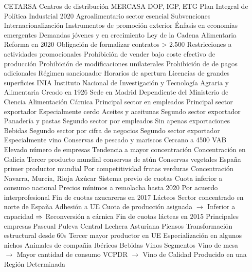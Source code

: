 \documentclass{nuevotema}
\begin{document}
\begin{esquemal}
				\4 CETARSA
			\3 Centros de distribución MERCASA
			\3 DOP, IGP, ETG
			\3 Plan Integral de Política Industrial 2020
				\4 Agroalimentario sector esencial
				\4 Subvenciones
			\3 Internacionalización
				\4 Instrumentos de promoción exterior
				\4 Énfasis en economías emergentes
				\4[] Demandas jóvenes y en crecimiento
			\3 Ley de la Cadena Alimentaria
				\4 Reforma en 2020
				\4[] Obligación de formalizar contratos > 2.500
				\4[] Restricciones a actividades promocionales
				\4[] Prohibición de vender bajo coste efectivo de producción
				\4[] Prohibición de modificaciones unilaterales
				\4[] Prohibición de de pagos adicionales
				\4[] Régimen sancionador
			\3 Horarios de apertura
			\3 Licencias de grandes superficies
			\3 INIA
				\4 Instituto Nacional de Investigación y Tecnología Agraria y Alimentaria
				\4 Creado en 1926
				\4 Sede en Madrid
				\4 Dependiente del Ministerio de Ciencia
		\2 Alimentación
			\3 Cárnica
				\4 Principal sector en empleados
				\4 Principal sector exportador
				\4 Especialmente cerdo
			\3 Aceites y aceitunas
				\4 Segundo sector exportador
			\3 Panadería y pastas
				\4 Segundo sector por empleados
				\4 Sin apenas exportaciones
			\3 Bebidas
				\4 Segundo sector por cifra de negocios
				\4 Segundo sector exportador
				\4[] Especialmente vino
			\3 Conservas de pescado y mariscos
				\4 Cercano a 4500 VAB
				\4 Elevado número de empresas
				\4[] Tendencia a mayor concentración
				\4 Concentración en Galicia
				\4 Tercer producto mundial conservas de atún
			\3 Conservas vegetales
				\4 España primer productor mundial
				\4[] Por competitividad frutas verduras
				\4 Concentración Navarra, Murcia, Rioja
			\3 Azúcar
				\4 Sistema previo de cuotas
				\4[] Cuota inferior a consumo nacional
				\4 Precios mínimos a remolacha hasta 2020
				\4[] Por acuerdo interprofesional
				\4 Fin de cuotas azucareras en 2017
			\3 Lácteos
				\4 Sector concentrado en norte de España
				\4 Adhesión a UE
				\4[] Cuota de producción asignada
				\4[] $\to$ Inferior a capacidad
				\4[] $\Rightarrow$ Reconversión a cárnica
				\4 Fin de cuotas lácteas en 2015
				\4 Principales empresas
				\4[] Pascual
				\4[] Puleva
				\4[] Central Lechera Asturiana
			\3 Piensos
				\4 Transformación estructural desde 60s
				\4 Tercer mayor productor en UE
				\4 Especialización en algunos nichos
				\4[] Animales de compañía
				\4[] Ibéricos
		\2 Bebidas
			\3 Vinos
				\4 Segmentos
				\4[] Vino de mesa
				\4[] $\to$ Mayor cantidad de consumo
				\4[] VCPDR
				\4[] $\to$ Vino de Calidad Producido en una Región Determinada

\end{esquemal}
\end{document}
